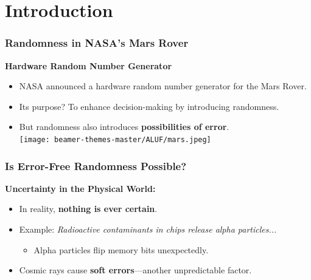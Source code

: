 \documentclass{beamer}
\begin{document}
\section{Introduction}
\begin{frame}
    \frametitle{Randomness in NASA's Mars Rover}
    \textbf{Hardware Random Number Generator} \\
    \pause
    \begin{itemize}
        \item NASA announced a hardware random number generator for the Mars Rover. \pause
        \item Its purpose? To enhance decision-making by introducing randomness. \pause
        \item But randomness also introduces \textbf{possibilities of error}. \\
        \vspace{0.5cm}
        \centering
        \texttt{[image: beamer-themes-master/ALUF/mars.jpeg]} %
    \end{itemize}
\end{frame}
\begin{frame}
    \frametitle{Is Error-Free Randomness Possible?}
    \textbf{Uncertainty in the Physical World:} \\
    \pause
    \begin{itemize}
        \item In reality, \textbf{nothing is ever certain}. \pause
        \item Example: \textit{Radioactive contaminants in chips release alpha particles...} \pause
            \begin{itemize}
                \item Alpha particles flip memory bits unexpectedly. \pause
            \end{itemize}
        \item Cosmic rays cause \textbf{soft errors}—another unpredictable factor.
    \end{itemize}
    \vspace{0.5cm}
\end{frame}
\end{document}
